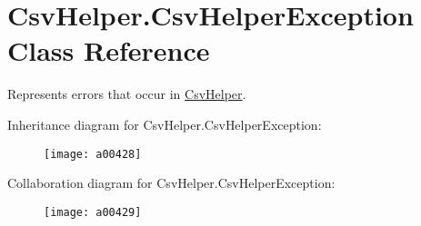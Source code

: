 \hypertarget{a00068}{\section{Csv\-Helper.\-Csv\-Helper\-Exception Class Reference}
\label{a00068}
}


Represents errors that occur in \hyperlink{a00340}{Csv\-Helper}.  




Inheritance diagram for Csv\-Helper.\-Csv\-Helper\-Exception\-:
\nopagebreak
\begin{figure}[H]
\begin{center}
\leavevmode
\texttt{[image: a00428]}
\end{center}
\end{figure}


Collaboration diagram for Csv\-Helper.\-Csv\-Helper\-Exception\-:
\nopagebreak
\begin{figure}[H]
\begin{center}
\leavevmode
\texttt{[image: a00429]}
\end{center}
\end{figure}
